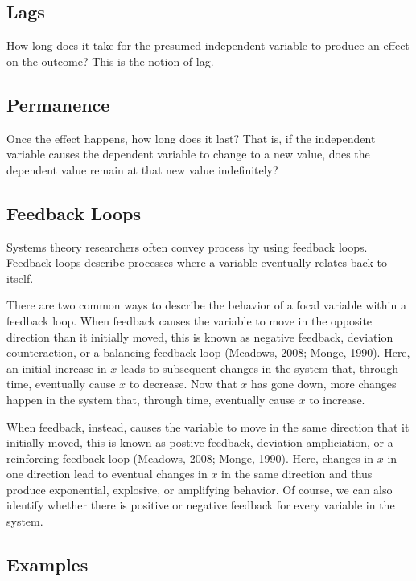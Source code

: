 \documentclass[english,,man]{apa6}
\theoremstyle{definition}
\theoremstyle{definition}
\theoremstyle{definition}
\theoremstyle{remark}
\begin{document}
\hypertarget{lags}{%
\subsection{Lags}\label{lags}}

How long does it take for the presumed independent variable to produce
an effect on the outcome? This is the notion of lag.

\hypertarget{permanence}{%
\subsection{Permanence}\label{permanence}}

Once the effect happens, how long does it last? That is, if the
independent variable causes the dependent variable to change to a new
value, does the dependent value remain at that new value indefinitely?

\hypertarget{feedback-loops}{%
\subsection{Feedback Loops}\label{feedback-loops}}

Systems theory researchers often convey process by using feedback loops.
Feedback loops describe processes where a variable eventually relates
back to itself.

There are two common ways to describe the behavior of a focal variable
within a feedback loop. When feedback causes the variable to move in the
opposite direction than it initially moved, this is known as negative
feedback, deviation counteraction, or a balancing feedback loop
(Meadows, 2008; Monge, 1990). Here, an initial increase in \(x\) leads
to subsequent changes in the system that, through time, eventually cause
\(x\) to decrease. Now that \(x\) has gone down, more changes happen in
the system that, through time, eventually cause \(x\) to increase.

When feedback, instead, causes the variable to move in the same
direction that it initially moved, this is known as postive feedback,
deviation ampliciation, or a reinforcing feedback loop (Meadows, 2008;
Monge, 1990). Here, changes in \(x\) in one direction lead to eventual
changes in \(x\) in the same direction and thus produce exponential,
explosive, or amplifying behavior. Of course, we can also identify
whether there is positive or negative feedback for every variable in the
system.

\hypertarget{examples}{%
\subsection{Examples}\label{examples}}
\end{document}
